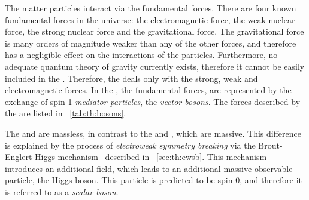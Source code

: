 The matter particles interact via the fundamental forces. There are four known fundamental forces in the universe: the electromagnetic force, the weak nuclear force, the strong nuclear force and the gravitational force. The gravitational force is many orders of magnitude weaker than any of the other forces, and therefore has a negligible effect on the interactions of the \SM particles. Furthermore, no adequate quantum theory of gravity currently exists, therefore it cannot be easily included in the \SM. Therefore, the \SM deals only with the strong, weak and electromagnetic forces. In the \SM, the fundamental forces, are represented by the exchange of spin-1 \emph{mediator particles}, the \emph{vector bosons}. 
The forces described by the \SM are listed in \Tab~\ref{tab:th:bosons}.

\begin{table}[h!]
 \caption{The three fundamental forces considered by the \SM are presented. For each force, the approximate strength relative to the strong force is shown, assuming two fundamental particles separated by a distance of $10^{-15}\m$. The mediator particle of each force is indicated along with its measured mass. \cite{Thomson:2013zua,PDGBooklet}}
\label{tab:th:bosons}
  \end{table}

The \Pphoton and \Pgluon are massless, in contrast to the \PWpm and \PZzero, which are massive. This difference is explained by the process of \emph{electroweak symmetry breaking} via the Brout-Englert-Higgs mechanism~\cite{Englert:1964et,Higgs:1964ia,Higgs:1964pj,Guralnik:1964eu,Higgs:1966ev,Kibble:1967sv} described in \Sec~\ref{sec:th:ewsb}. This mechanism introduces an additional field, which leads to an additional massive observable particle, the Higgs boson. This particle is predicted to be spin-$0$, and therefore it is referred to as a \emph{scalar boson}.

